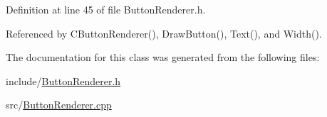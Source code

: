 Definition at line 45 of file Button\+Renderer.\+h.



Referenced by C\+Button\+Renderer(), Draw\+Button(), Text(), and Width().



The documentation for this class was generated from the following files\+:\begin{DoxyCompactItemize}
\item 
include/\hyperlink{ButtonRenderer_8h}{Button\+Renderer.\+h}\item 
src/\hyperlink{ButtonRenderer_8cpp}{Button\+Renderer.\+cpp}\end{DoxyCompactItemize}
